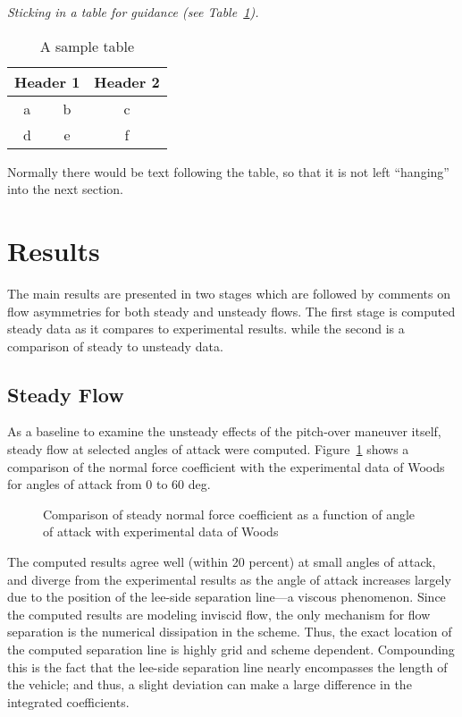 \documentclass[cover]{aiaa}%
\begin{document}
{\em Sticking in a table for guidance (see Table~\ref{tab:sample}).}
\begin{table}[htbp]
  \begin{center}
    \caption{A sample table}
    \begin{tabular}{ccc} \hline\hline
      \multicolumn{2}{c}{Header 1} & Header 2 \\ \hline
      a & b & c \\
      d & e & f \\ \hline\hline
    \end{tabular}
    \label{tab:sample}
  \end{center}
\end{table}
Normally there would be text following the table, so that it
is not left ``hanging'' into the next section.

\section{Results}

The main results are presented in two stages which are followed
by comments on flow asymmetries for both steady and unsteady
flows.  The first stage is computed steady data as it compares to
experimental results.  while the second is a comparison of steady
to unsteady data.

\subsection{Steady Flow}

As a baseline to examine the unsteady effects of the pitch-over
maneuver itself, steady flow at selected angles of attack were
computed.  Figure~\ref{f:expcomp} shows a comparison of the
normal force coefficient with the experimental data of
Woods\cite{woods:95cp} for angles of attack from 0 to 60 deg.
\begin{figure}
   \caption{Comparison of steady normal force coefficient as a
     function of angle of attack with experimental data of
     Woods}
   \label{f:expcomp}
\end{figure}
The computed results agree well (within 20 percent) at small angles of attack,
and diverge from the experimental results as the angle
of attack increases largely due to the position of the lee-side
separation line---a viscous phenomenon.
Since the computed results are modeling inviscid
flow, the only mechanism for flow separation is the numerical
dissipation in the scheme.  Thus, the exact location of the computed
separation line is highly grid and scheme dependent. Compounding
this is the fact that the lee-side separation line nearly
encompasses the length of the vehicle; and thus, a slight
deviation can make a large difference in the integrated coefficients.
\end{document}
